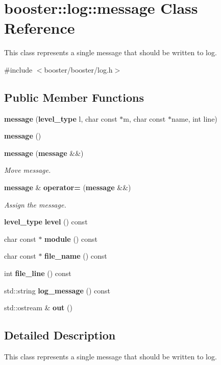 \section{booster\+:\+:log\+:\+:message Class Reference}
\label{classbooster_1_1log_1_1message}


This class represents a single message that should be written to log.  




{\ttfamily \#include $<$booster/booster/log.\+h$>$}

\subsection*{Public Member Functions}
\begin{DoxyCompactItemize}
\item 
{\bf message} ({\bf level\+\_\+type} l, char const $\ast$m, char const $\ast$name, int line)
\item 
{\bf message} ()
\item 
{\bf message} ({\bf message} \&\&)\label{classbooster_1_1log_1_1message_a66c13bda93872c1408a188f2cf4e6478}

\begin{DoxyCompactList}\small\item\em Move message. \end{DoxyCompactList}\item 
{\bf message} \& {\bf operator=} ({\bf message} \&\&)\label{classbooster_1_1log_1_1message_a01c84862c1a709883512f8846996ece7}

\begin{DoxyCompactList}\small\item\em Assign the message. \end{DoxyCompactList}\item 
{\bf level\+\_\+type} {\bf level} () const 
\item 
char const $\ast$ {\bf module} () const 
\item 
char const $\ast$ {\bf file\+\_\+name} () const 
\item 
int {\bf file\+\_\+line} () const 
\item 
std\+::string {\bf log\+\_\+message} () const 
\item 
std\+::ostream \& {\bf out} ()
\end{DoxyCompactItemize}


\subsection{Detailed Description}
This class represents a single message that should be written to log. 

